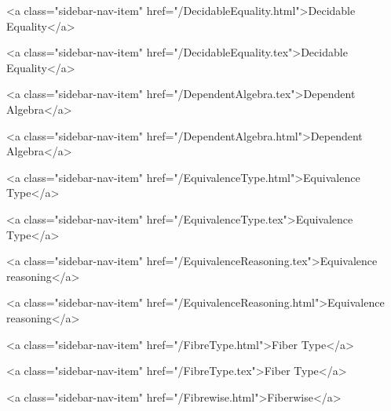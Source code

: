       
    
      
        
          <a class="sidebar-nav-item" href="/DecidableEquality.html">Decidable Equality</a>
        
      
    
      
        
          <a class="sidebar-nav-item" href="/DecidableEquality.tex">Decidable Equality</a>
        
      
    
      
        
          <a class="sidebar-nav-item" href="/DependentAlgebra.tex">Dependent Algebra</a>
        
      
    
      
        
          <a class="sidebar-nav-item" href="/DependentAlgebra.html">Dependent Algebra</a>
        
      
    
      
        
          <a class="sidebar-nav-item" href="/EquivalenceType.html">Equivalence Type</a>
        
      
    
      
        
          <a class="sidebar-nav-item" href="/EquivalenceType.tex">Equivalence Type</a>
        
      
    
      
        
          <a class="sidebar-nav-item" href="/EquivalenceReasoning.tex">Equivalence reasoning</a>
        
      
    
      
        
          <a class="sidebar-nav-item" href="/EquivalenceReasoning.html">Equivalence reasoning</a>
        
      
    
      
        
          <a class="sidebar-nav-item" href="/FibreType.html">Fiber Type</a>
        
      
    
      
        
          <a class="sidebar-nav-item" href="/FibreType.tex">Fiber Type</a>
        
      
    
      
        
          <a class="sidebar-nav-item" href="/Fibrewise.html">Fiberwise</a>
        
